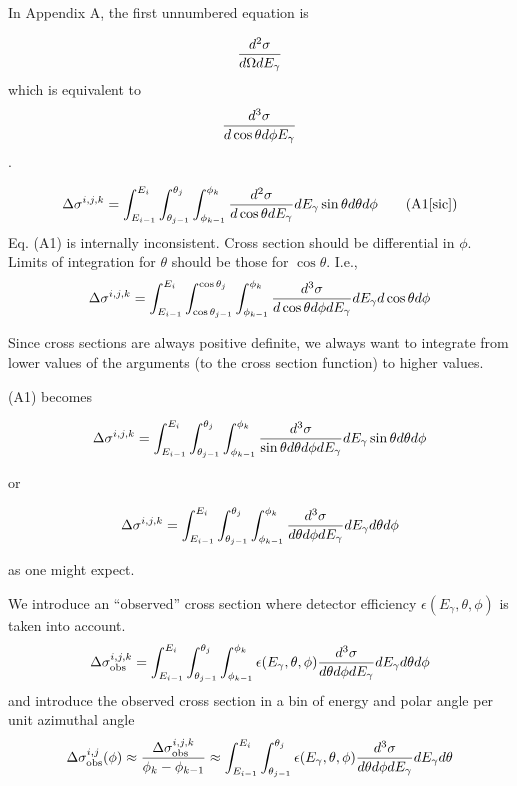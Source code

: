 \documentclass{article}
\begin{document}
In Appendix A, the first unnumbered equation is

\begin{equation}
      {d^2\sigma \over d\Omega dE_\gamma}
\end{equation}
which is equivalent to 
\begin{equation}
      {d^3\sigma \over d\cos\theta d\phi E_\gamma}
\end{equation}.

\begin{equation}
  \Delta\sigma^{i,j,k} = \int^{E_i}_{E_{i-1}}\int^{\theta_j}_{\theta_{j-1}}\int^{\phi_k}_{\phi_{k-1}} {d^2\sigma \over d\cos\theta dE_\gamma}dE_\gamma \sin\theta d\theta d\phi
  \tag{A1[sic]}
\end{equation}
Eq. (A1) is internally inconsistent. Cross section should be differential in $\phi$. Limits of integration for $\theta$ should be those for $\cos\theta$. I.e.,
\begin{equation}\Delta\sigma^{i,j,k} = \int^{E_i}_{E_{i-1}}\int^{\cos\theta_j}_{\cos\theta_{j-1}}\int^{\phi_k}_{\phi_{k-1}} {d^3\sigma \over d\cos\theta d\phi dE_\gamma}dE_\gamma d\cos\theta d\phi\end{equation}

Since cross sections are always positive definite, we always want to integrate from lower values of the arguments (to the cross section function) to higher values.

(A1) becomes

\begin{equation}\Delta\sigma^{i,j,k} = \int^{E_i}_{E_{i-1}}\int_{\theta_{j-1}}^{\theta_j}\int^{\phi_k}_{\phi_{k-1}} {d^3\sigma \over \sin\theta d\theta d\phi dE_\gamma} dE_\gamma \sin\theta d\theta d\phi\end{equation}

or

\begin{equation}\Delta\sigma^{i,j,k} = \int^{E_i}_{E_{i-1}}\int_{\theta_{j-1}}^{\theta_j}\int^{\phi_k}_{\phi_{k-1}} {d^3\sigma \over d\theta d\phi dE_\gamma} dE_\gamma d\theta d\phi\end{equation}

as one might expect.

We introduce an ``observed'' cross section where detector efficiency $\epsilon(E_\gamma,\theta,\phi)$ is taken into account.
\begin{equation}
\Delta\sigma^{i,j,k}_{\rm obs} = \int^{E_i}_{E_{i-1}}\int_{\theta_{j-1}}^{\theta_j}\int^{\phi_k}_{\phi_{k-1}} \epsilon(E_\gamma,\theta,\phi) {d^3\sigma \over d\theta d\phi dE_\gamma} dE_\gamma d\theta d\phi
\end{equation}
and introduce the observed cross section in a bin of energy and polar angle per unit azimuthal angle
\begin{equation}
\Delta\sigma^{i,j}_{\rm obs}(\phi) \approx {\Delta\sigma^{i,j,k}_{\rm obs} \over \phi_k - \phi_{k-1}} \approx \int^{E_i}_{E_{i-1}}\int_{\theta_{j-1}}^{\theta_j} \epsilon(E_\gamma,\theta,\phi) {d^3\sigma \over d\theta d\phi dE_\gamma} dE_\gamma d\theta\end{equation}
\end{document}
